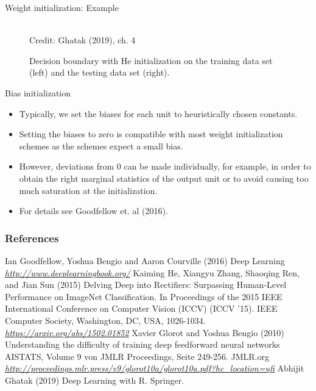 \begin{vbframe}{Weight initialization: Example}
\begin{figure}
      \tiny{\\ Credit: Ghatak (2019), ch. 4}
      \caption{Decision boundary with He initialization on the training data set (left) and the testing data set (right).}
  \end{figure}
\end{vbframe}

\begin{vbframe}{Bias initialization}
  \begin{itemize}
    \item Typically, we set the biases for each unit to heuristically chosen constants. 
    \item Setting the biases to zero is compatible with most weight
initialization schemes as the schemes expect a small bias. 
    \item However, deviations from 0 can be made individually, for example, in order to obtain the right marginal statistics of the output unit or to avoid causing too much saturation at the initialization.
    \item For details see Goodfellow et. al (2016).
  \end{itemize}
\end{vbframe}



\begin{vbframe}
\frametitle{References}
\footnotesize{
\begin{thebibliography}{99}
 Ian Goodfellow, Yoshua Bengio and Aaron Courville (2016)
\newblock Deep Learning
\newblock \emph{\url{http://www.deeplearningbook.org/}}
 Kaiming He, Xiangyu Zhang, Shaoqing Ren, and Jian Sun (2015)
\newblock Delving Deep into Rectifiers: Surpassing Human-Level Performance on ImageNet Classification. In Proceedings of the 2015 IEEE International Conference on Computer Vision (ICCV) (ICCV '15). IEEE Computer Society, Washington, DC, USA, 1026-1034. 
\newblock \emph{\url{https://arxiv.org/abs/1502.01852}}
 Xavier Glorot and Yoshua Bengio  (2010)
\newblock Understanding the difficulty of training deep feedforward neural networks AISTATS, Volume 9 von JMLR Proceedings, Seite 249-256. JMLR.org
\newblock \emph{\url{http://proceedings.mlr.press/v9/glorot10a/glorot10a.pdf?hc_location=ufi}}
 Abhijit Ghatak (2019)
\newblock Deep Learning with R. Springer.
\end{thebibliography}
}
\end{vbframe}



